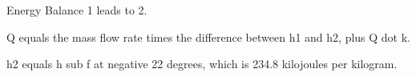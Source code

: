 Energy Balance 1 leads to 2.

Q equals the mass flow rate times the difference between h1 and h2, plus Q dot k.

h2 equals h sub f at negative 22 degrees, which is 234.8 kilojoules per kilogram.